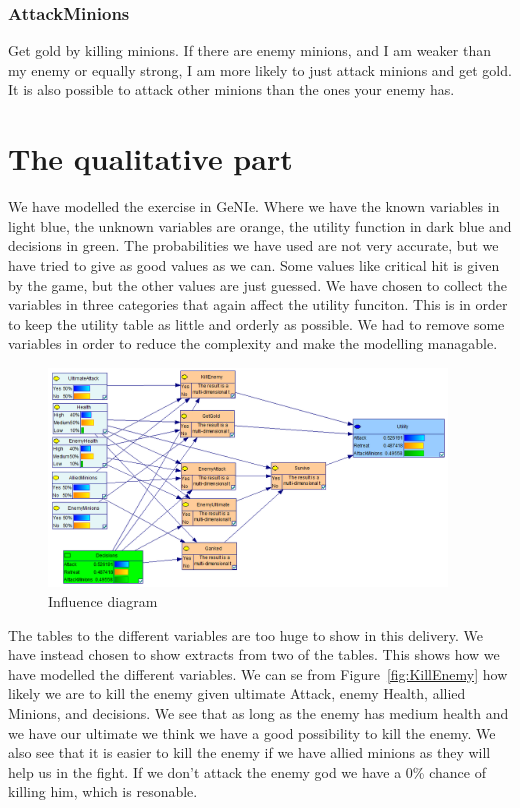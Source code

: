 \documentclass[titlepage]{article}
\begin{document}
\subsubsection*{AttackMinions}
Get gold by killing minions. If there are enemy minions, and I am weaker than my enemy or equally strong, I am more likely to just attack minions and get gold. It is also possible to attack other minions than the ones your enemy has. 

\newpage

\section{The qualitative part}
We have modelled the exercise in GeNIe. Where we have the known variables in light blue, the unknown variables are orange, the utility function in dark blue and decisions in green. The probabilities we have used are not very accurate, but we have tried to give as good values as we can. Some values like critical hit is given by the game, but the other values are just guessed. We have chosen to collect the variables in three categories that again affect the utility funciton. This is in order to keep the utility table as little and orderly as possible. We had to remove some variables in order to reduce the complexity and make the modelling managable.

\begin{figure}[H]
\label{fig:Influencediagram}
\includegraphics[width=400px]{InfluenceDiagram.PNG}
\caption{Influence diagram}
\end{figure}

The tables to the different variables are too huge to show in this delivery. We have instead chosen to show extracts from two of the tables. This shows how we have modelled the different variables. We can se from Figure~\ref{fig:KillEnemy} how likely we are to kill the enemy given ultimate Attack, enemy Health, allied Minions, and decisions. We see that as long as the enemy has medium health and we have our ultimate we think we have a good possibility to kill the enemy. We also see that it is easier to kill the enemy if we have allied minions as they will help us in the fight. If we don't attack the enemy god we have a 0\% chance of killing him, which is resonable.
\end{document}
